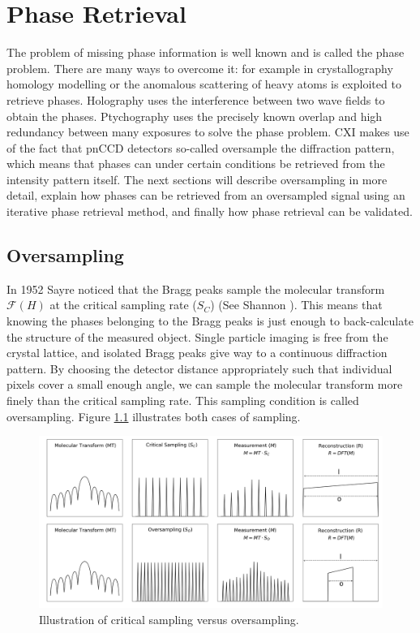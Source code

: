 \chapter{Phase Retrieval}
The problem of missing phase information is well known and is called the phase problem. There are many ways to overcome it: for example in crystallography homology modelling or the anomalous scattering of heavy atoms is exploited to retrieve phases. Holography uses the interference between two wave fields to obtain the phases. Ptychography uses the precisely known overlap and high redundancy between many exposures to solve the phase problem. CXI makes use of the fact that pnCCD detectors so-called oversample the diffraction pattern, which means that phases can under certain conditions be retrieved from the intensity pattern itself. The next sections will describe oversampling in more detail, explain how phases can be retrieved from an oversampled signal using an iterative phase retrieval method, and finally how phase retrieval can be validated. 

\section{Oversampling} 
In 1952 Sayre noticed that the Bragg peaks sample the molecular transform $\mathcal{F}(H)$ at the critical sampling rate ($S_C$)\cite{Sayre1952a} (See Shannon \cite{Shannon1949a}). This means that knowing the phases belonging to the Bragg peaks is just enough to back-calculate the structure of the measured object. Single particle imaging is free from the crystal lattice, and isolated Bragg peaks give way to a continuous diffraction pattern. By choosing the detector distance appropriately such that individual pixels cover a small enough angle, we can sample the molecular transform more finely than the critical sampling rate. This sampling condition is called oversampling. Figure \ref{fig:sampling} illustrates both cases of sampling. 

\begin{figure}[h]
	\centering 
		\includegraphics[width=120mm]{sampling.png}
	\caption{Illustration of critical sampling versus 		oversampling.}
	\label{fig:sampling}
\end{figure}

